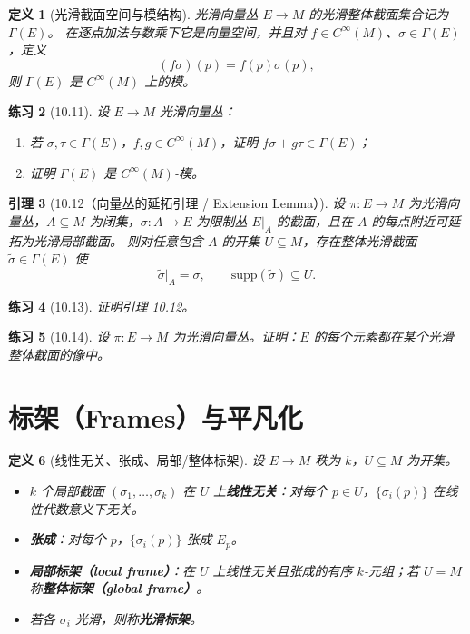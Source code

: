 \documentclass[12pt]{article}
\newtheorem{definition}{定义}[section]
\newtheorem{lemma}[definition]{引理}
\newtheorem{exercise}[definition]{练习}
\begin{document}
\begin{definition}[光滑截面空间与模结构]
光滑向量丛 $E\to M$ 的光滑整体截面集合记为 $\Gamma(E)$。
在逐点加法与数乘下它是向量空间，并且对 $f\in C^\infty(M)$、$\sigma\in\Gamma(E)$，定义
\[
(f\sigma)(p)=f(p)\sigma(p),
\]
则 $\Gamma(E)$ 是 $C^\infty(M)$ 上的模。
\end{definition}

\begin{exercise}[10.11]
设 $E\to M$ 光滑向量丛：
\begin{enumerate}[label=(\alph*)]
\item 若 $\sigma,\tau\in\Gamma(E)$，$f,g\in C^\infty(M)$，证明 $f\sigma+g\tau\in\Gamma(E)$；
\item 证明 $\Gamma(E)$ 是 $C^\infty(M)$-模。
\end{enumerate}
\end{exercise}

\begin{lemma}[10.12（向量丛的延拓引理 / Extension Lemma）]
设 $\pi:E\to M$ 为光滑向量丛，$A\subseteq M$ 为闭集，$\sigma:A\to E$ 为限制丛 $E|_A$ 的截面，且在 $A$ 的每点附近可延拓为光滑局部截面。
则对任意包含 $A$ 的开集 $U\subseteq M$，存在整体光滑截面 $\tilde\sigma\in\Gamma(E)$ 使
\[
\tilde\sigma|_A=\sigma,\qquad \mathrm{supp}(\tilde\sigma)\subseteq U.
\]
\end{lemma}

\begin{exercise}[10.13]
证明引理 10.12。
\end{exercise}

\begin{exercise}[10.14]
设 $\pi:E\to M$ 为光滑向量丛。证明：$E$ 的每个元素都在某个光滑整体截面的像中。
\end{exercise}

\section{标架（Frames）与平凡化}

\begin{definition}[线性无关、张成、局部/整体标架]
设 $E\to M$ 秩为 $k$，$U\subseteq M$ 为开集。
\begin{itemize}
\item $k$ 个局部截面 $(\sigma_1,\dots,\sigma_k)$ 在 $U$ 上\textbf{线性无关}：对每个 $p\in U$，$\{\sigma_i(p)\}$ 在线性代数意义下无关。
\item \textbf{张成}：对每个 $p$，$\{\sigma_i(p)\}$ 张成 $E_p$。
\item \textbf{局部标架（local frame）}：在 $U$ 上线性无关且张成的有序 $k$-元组；若 $U=M$ 称\textbf{整体标架（global frame）}。
\item 若各 $\sigma_i$ 光滑，则称\textbf{光滑标架}。
\end{itemize}
\end{definition}
\end{document}
